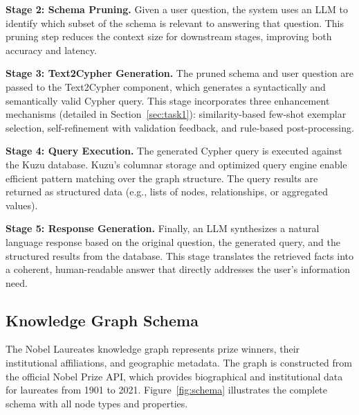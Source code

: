 \documentclass[sigconf]{acmart}
\begin{document}
\textbf{Stage 2: Schema Pruning.} Given a user question, the system uses an LLM to identify which subset of the schema is relevant to answering that question. This pruning step reduces the context size for downstream stages, improving both accuracy and latency.

\textbf{Stage 3: Text2Cypher Generation.} The pruned schema and user question are passed to the Text2Cypher component, which generates a syntactically and semantically valid Cypher query. This stage incorporates three enhancement mechanisms (detailed in Section~\ref{sec:task1}): similarity-based few-shot exemplar selection, self-refinement with validation feedback, and rule-based post-processing.

\textbf{Stage 4: Query Execution.} The generated Cypher query is executed against the Kuzu database. Kuzu's columnar storage and optimized query engine enable efficient pattern matching over the graph structure. The query results are returned as structured data (e.g., lists of nodes, relationships, or aggregated values).

\textbf{Stage 5: Response Generation.} Finally, an LLM synthesizes a natural language response based on the original question, the generated query, and the structured results from the database. This stage translates the retrieved facts into a coherent, human-readable answer that directly addresses the user's information need.


\subsection{Knowledge Graph Schema}
\label{sec:schema}

The Nobel Laureates knowledge graph represents prize winners, their institutional affiliations, and geographic metadata. The graph is constructed from the official Nobel Prize API, which provides biographical and institutional data for laureates from 1901 to 2021. Figure~\ref{fig:schema} illustrates the complete schema with all node types and properties.
\end{document}
